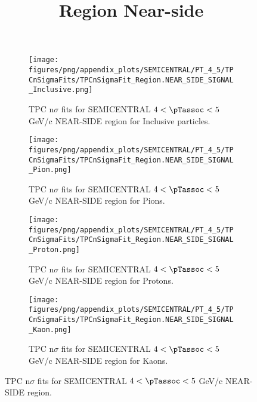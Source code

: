             \begin{figure}[H]
                \title{Region Near-side}
                \begin{subfigure}[b]{0.5\textwidth}
                    \centering
                    \texttt{[image: figures/png/appendix\_plots/SEMICENTRAL/PT\_4\_5/TPCnSigmaFits/TPCnSigmaFit\_Region.NEAR\_SIDE\_SIGNAL\_Inclusive.png]}
                    \caption{TPC n$\sigma$ fits for SEMICENTRAL $4 < \pTassoc < 5$ GeV/c NEAR-SIDE region for Inclusive particles.}
                    \label{fig:appendix_SEMICENTRAL_$4 < \pTassoc < 5$ GeV/c_NEAR_SIDE_SIGNAL_Inclusive}
                \end{subfigure}
                \begin{subfigure}[b]{0.5\textwidth}
                    \centering
                    \texttt{[image: figures/png/appendix\_plots/SEMICENTRAL/PT\_4\_5/TPCnSigmaFits/TPCnSigmaFit\_Region.NEAR\_SIDE\_SIGNAL\_Pion.png]}
                    \caption{TPC n$\sigma$ fits for SEMICENTRAL $4 < \pTassoc < 5$ GeV/c NEAR-SIDE region for Pions.}
                    \label{fig:appendix_SEMICENTRAL_$4 < \pTassoc < 5$ GeV/c_NEAR_SIDE_SIGNAL_Pion}
                \end{subfigure}
                \begin{subfigure}[b]{0.5\textwidth}
                    \centering
                    \texttt{[image: figures/png/appendix\_plots/SEMICENTRAL/PT\_4\_5/TPCnSigmaFits/TPCnSigmaFit\_Region.NEAR\_SIDE\_SIGNAL\_Proton.png]}
                    \caption{TPC n$\sigma$ fits for SEMICENTRAL $4 < \pTassoc < 5$ GeV/c NEAR-SIDE region for Protons.}
                    \label{fig:appendix_SEMICENTRAL_$4 < \pTassoc < 5$ GeV/c_NEAR_SIDE_SIGNAL_Proton}
                \end{subfigure}
                \begin{subfigure}[b]{0.5\textwidth}
                    \centering
                    \texttt{[image: figures/png/appendix\_plots/SEMICENTRAL/PT\_4\_5/TPCnSigmaFits/TPCnSigmaFit\_Region.NEAR\_SIDE\_SIGNAL\_Kaon.png]}
                    \caption{TPC n$\sigma$ fits for SEMICENTRAL $4 < \pTassoc < 5$ GeV/c NEAR-SIDE region for Kaons.}
                    \label{fig:appendix_SEMICENTRAL_$4 < \pTassoc < 5$ GeV/c_NEAR_SIDE_SIGNAL_Kaon}
                \end{subfigure}
                \caption{TPC n$\sigma$ fits for SEMICENTRAL $4 < \pTassoc < 5$ GeV/c NEAR-SIDE region.}
                \label{fig:appendix_SEMICENTRAL_$4 < \pTassoc < 5$ GeV/c_NEAR_SIDE_SIGNAL}
            \end{figure}
